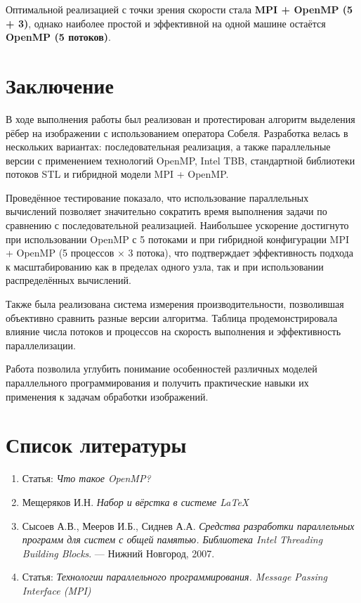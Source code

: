 \documentclass[14pt,a4paper]{extarticle}
\begin{document}
Оптимальной реализацией с точки зрения скорости стала \textbf{MPI + OpenMP (5 + 3)}, 
однако наиболее простой и эффективной на одной машине остаётся \textbf{OpenMP (5 потоков)}.

\section{Заключение}

В ходе выполнения работы был реализован и протестирован алгоритм выделения рёбер на изображении с использованием оператора Собеля. 
Разработка велась в нескольких вариантах: последовательная реализация, а также параллельные версии с применением технологий OpenMP, Intel TBB, 
стандартной библиотеки потоков STL и гибридной модели MPI + OpenMP.

Проведённое тестирование показало, что использование параллельных вычислений позволяет значительно сократить время выполнения задачи по сравнению с последовательной реализацией. 
Наибольшее ускорение достигнуто при использовании OpenMP с 5 потоками и при гибридной конфигурации MPI + OpenMP (5 процессов × 3 потока), 
что подтверждает эффективность подхода к масштабированию как в пределах одного узла, так и при использовании распределённых вычислений.

Также была реализована система измерения производительности, позволившая объективно сравнить разные версии алгоритма. 
Таблица продемонстрировала влияние числа потоков и процессов на скорость выполнения и эффективность параллелизации.

Работа позволила углубить понимание особенностей различных моделей параллельного программирования и получить практические навыки их применения к задачам обработки изображений.

\section{Список литературы}

\begin{enumerate}
    \item Статья: \textit{Что такое OpenMP?}
    \item Мещеряков И.Н. \textit{Набор и вёрстка в системе \LaTeX}
    \item Сысоев А.В., Мееров И.Б., Сиднев А.А. \textit{Средства разработки параллельных программ для систем с общей памятью. Библиотека Intel Threading Building Blocks}. — Нижний Новгород, 2007.
    \item Статья: \textit{Технологии параллельного программирования. Message Passing Interface (MPI)}
\end{enumerate}
\end{document}
